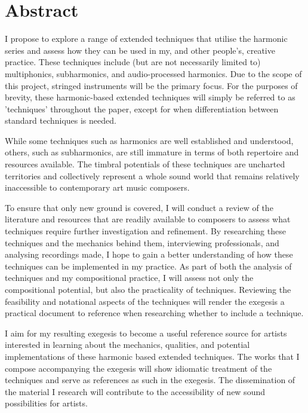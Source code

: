 \chapter*{Abstract}

I propose to explore a range of extended techniques that utilise the harmonic series and assess how they can be used in my, and other people’s, creative practice. These techniques include (but are not necessarily limited to) multiphonics, subharmonics, and audio-processed harmonics. Due to the scope of this project, stringed instruments will be the primary focus. For the purposes of brevity, these harmonic-based extended techniques will simply be referred to as 'techniques' throughout the paper, except for when differentiation between standard techniques is needed. 

While some techniques such as harmonics are well established and understood, others, such as subharmonics, are still immature in terms of both repertoire and resources available.  The timbral potentials of these techniques are uncharted territories and collectively represent a whole sound world that remains relatively inaccessible to contemporary art music composers.

To ensure that only new ground is covered, I will conduct a review of the literature and resources that are readily available to composers to assess what techniques require further investigation and refinement. By researching these techniques and the mechanics behind them, interviewing professionals, and analysing recordings made, I hope to gain a better understanding of how these techniques can be implemented in my practice. As part of both the analysis of techniques and my compositional practice, I will assess not only the compositional potential, but also the practicality of techniques. Reviewing the feasibility and notational aspects of the techniques will render the exegesis a practical document to reference when researching whether to include a technique.

I aim for my resulting exegesis to become a useful reference source for artists interested in learning about the mechanics, qualities, and potential implementations of these harmonic based extended techniques. The works that I compose accompanying the exegesis will show idiomatic treatment of the techniques and serve as references as such in the exegesis. The dissemination of the material I research will contribute to the accessibility of new sound possibilities for artists.